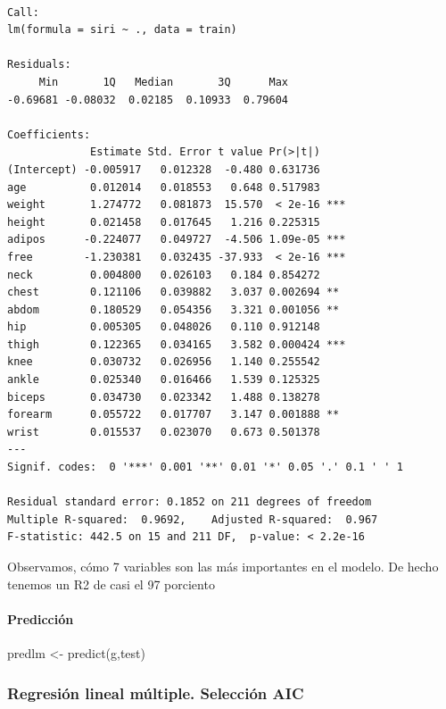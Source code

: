 \documentclass[
  letterpaper,
  DIV=11,
  numbers=noendperiod]{scrartcl}
\let\oldparagraph\paragraph
\renewcommand{\paragraph}[1]{\oldparagraph{#1}\mbox{}}
\newenvironment{Shaded}{\begin{snugshade}}{\end{snugshade}}
\newcommand{\FunctionTok}[1]{\textcolor[rgb]{0.28,0.35,0.67}{#1}}
\newcommand{\NormalTok}[1]{\textcolor[rgb]{0.00,0.23,0.31}{#1}}
\newcommand{\OtherTok}[1]{\textcolor[rgb]{0.00,0.23,0.31}{#1}}
\begin{document}
\begin{verbatim}

Call:
lm(formula = siri ~ ., data = train)

Residuals:
     Min       1Q   Median       3Q      Max 
-0.69681 -0.08032  0.02185  0.10933  0.79604 

Coefficients:
             Estimate Std. Error t value Pr(>|t|)    
(Intercept) -0.005917   0.012328  -0.480 0.631736    
age          0.012014   0.018553   0.648 0.517983    
weight       1.274772   0.081873  15.570  < 2e-16 ***
height       0.021458   0.017645   1.216 0.225315    
adipos      -0.224077   0.049727  -4.506 1.09e-05 ***
free        -1.230381   0.032435 -37.933  < 2e-16 ***
neck         0.004800   0.026103   0.184 0.854272    
chest        0.121106   0.039882   3.037 0.002694 ** 
abdom        0.180529   0.054356   3.321 0.001056 ** 
hip          0.005305   0.048026   0.110 0.912148    
thigh        0.122365   0.034165   3.582 0.000424 ***
knee         0.030732   0.026956   1.140 0.255542    
ankle        0.025340   0.016466   1.539 0.125325    
biceps       0.034730   0.023342   1.488 0.138278    
forearm      0.055722   0.017707   3.147 0.001888 ** 
wrist        0.015537   0.023070   0.673 0.501378    
---
Signif. codes:  0 '***' 0.001 '**' 0.01 '*' 0.05 '.' 0.1 ' ' 1

Residual standard error: 0.1852 on 211 degrees of freedom
Multiple R-squared:  0.9692,    Adjusted R-squared:  0.967 
F-statistic: 442.5 on 15 and 211 DF,  p-value: < 2.2e-16
\end{verbatim}

Observamos, cómo 7 variables son las más importantes en el modelo. De
hecho tenemos un R2 de casi el 97 porciento

\hypertarget{predicciuxf3n}{%
\paragraph{Predicción}\label{predicciuxf3n}}

\begin{Shaded}
\begin{Highlighting}[]
\NormalTok{predlm  }\OtherTok{\textless{}{-}} \FunctionTok{predict}\NormalTok{(g,test)}
\end{Highlighting}
\end{Shaded}

\hypertarget{regresiuxf3n-lineal-muxfaltiple.-selecciuxf3n-aic}{%
\subsubsection{Regresión lineal múltiple. Selección
AIC}\label{regresiuxf3n-lineal-muxfaltiple.-selecciuxf3n-aic}}
\end{document}
